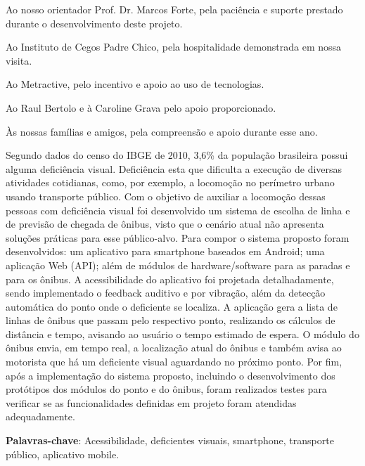 \documentclass[
	12pt,				%
	oneside,			%
	a4paper,			%
	brazil				%
]{abntex2}
\begin{document}
\begin{agradecimentos} 
Ao nosso orientador Prof. Dr. Marcos Forte, pela paciência e suporte prestado durante o desenvolvimento deste projeto.

Ao Instituto de Cegos Padre Chico, pela hospitalidade demonstrada em nossa visita.

Ao Metractive, pelo incentivo e apoio ao uso de tecnologias.

Ao Raul Bertolo e à Caroline Grava pelo apoio proporcionado.

Às nossas famílias e amigos, pela compreensão e apoio durante esse ano.
\end{agradecimentos} 


\setlength{\absparsep}{18pt} %
\begin{resumo}
 
Segundo dados do censo do IBGE de 2010, 3,6\% da população brasileira possui alguma deficiência visual. Deficiência esta que dificulta a execução de diversas atividades cotidianas, como, por exemplo, a locomoção no perímetro urbano usando transporte público. Com o objetivo de auxiliar a locomoção dessas pessoas com deficiência visual foi desenvolvido um sistema de escolha de linha e de previsão de chegada de ônibus, visto que o cenário atual não apresenta soluções práticas para esse público-alvo. Para compor o sistema proposto foram desenvolvidos: um aplicativo para smartphone baseados em Android; uma aplicação Web (API); além de módulos de hardware/software para as paradas e para os ônibus. A acessibilidade do aplicativo foi projetada detalhadamente, sendo implementado o feedback auditivo e por vibração, além da detecção automática do ponto onde o deficiente se localiza.  A aplicação gera a lista de linhas de ônibus que passam pelo respectivo ponto, realizando os cálculos de distância e tempo, avisando ao usuário o tempo estimado de espera. O módulo do ônibus envia, em tempo real, a localização atual do ônibus e também avisa ao motorista que há um deficiente visual aguardando no próximo ponto.  Por fim, após a implementação do sistema proposto, incluindo o desenvolvimento dos protótipos dos módulos do ponto e do ônibus, foram realizados testes para verificar se as funcionalidades definidas em projeto foram atendidas adequadamente. 

 \textbf{Palavras-chave}: Acessibilidade, deficientes visuais, smartphone, transporte público, aplicativo mobile.
\end{resumo}
\end{document}

